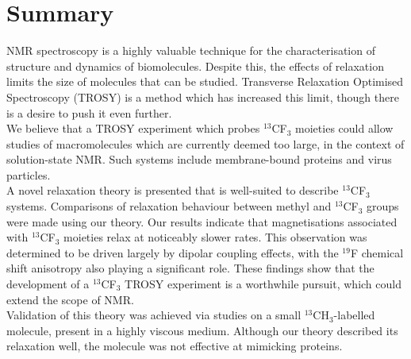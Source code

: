 \chapter{Summary}%



\begin{summarytext}
NMR spectroscopy is a highly valuable technique for the characterisation of structure and dynamics of biomolecules. Despite this, the effects of relaxation limits the size of molecules that can be studied. Transverse Relaxation Optimised Spectroscopy (TROSY) is a method which has increased this limit, though there is a desire to push it even further.\\
We believe that a TROSY experiment which probes $^{13}$CF$_3$ moieties could allow studies of macromolecules which are currently deemed too large, in the context of solution-state NMR. Such systems include membrane-bound proteins and virus particles.\\
A novel relaxation theory is presented that is well-suited to describe $^{13}$CF$_3$ systems. Comparisons of relaxation behaviour between methyl and $^{13}$CF$_3$ groups were made using our theory. Our results indicate that magnetisations associated with $^{13}$CF$_3$ moieties relax at noticeably slower rates. This observation was determined to be driven largely by dipolar coupling effects, with the $^{19}$F chemical shift anisotropy also playing a significant role. These findings show that the development of a $^{13}$CF$_3$ TROSY experiment is a worthwhile pursuit, which could extend the scope of NMR.\\
Validation of this theory was achieved via studies on a small $^{13}$CH$_3$-labelled molecule, present in a highly viscous medium. Although our theory described its relaxation well, the molecule was not effective at mimicking proteins.\\
\end{summarytext}


\AtNextBibliography{\footnotesize}
